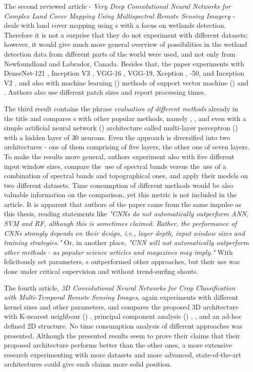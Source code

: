 The second reviewed article - \textit{Very Deep Convolutional Neural Networks for Complex Land Cover Mapping Using Multispectral Remote Sensing Imagery} - deals with land cover mapping using s with a focus on wetlands detection. Therefore it is not a surprise that they do not experiment with different datasets; however, it would give much more general overview of  possibilities in the wetland detection data from different parts of the world were used, and not only from Newfoundland and Labrador, Canada. Besides that, the paper experiments with DenseNet-121 \cite{densenet}, Inception V3 \cite{inception}, VGG-16 \cite{vgg}, VGG-19, Xception \cite{xception}, -50, and Inception  V2 \cite{inception-resnet}, and also with machine learning () methods of support vector machine () \cite{svm} and . Authors also use different patch sizes and report processing times.

The third result contains the phrase \textit{evaluation of different methods} already in the title and compares s with other popular  methods, namely , , and even with a simple artificial neural network () architecture called multi-layer perceptron () \cite{mlp} with a hidden layer of 30 neurons. Even the  approach is diversified into two architectures - one of them comprising of five layers, the other one of seven layers. To make the results more general, authors experiment also with five different input window sizes, compare the~use of spectral bands versus the~use of a combination of spectral bands and topographical ones, and apply their models on two different datasets. Time consumption of different methods would be also valuable information on the comparison, yet this metric is not included in the article. It is apparent that authors of the paper came from the same impulse as this thesis, reading statements like \textit{"CNNs do not automatically outperform ANN, SVM and RF, although this is sometimes claimed. Rather, the performance of CNNs strongly depends on their design, i.e., layer depth, input window sizes and training strategies."} Or, in another place, \textit{"CNN will not automatically outperform other methods - as popular science articles and magazines may imply."} With felicitously set parameters, s outperformed other approaches, but their use was done under critical supervision and without trend-surfing shouts.

The fourth article, \textit{3D Convolutional Neural Networks for Crop Classification with Multi-Temporal Remote Sensing Images}, again experiments with different kernel sizes and other parameters, and compares the proposed 3D  architecture with K-nearest neighbour () \cite{knn}, principal component analysis () \cite{pca}, , and an ad-hoc defined 2D  structure. No time consumption analysis of different approaches was presented. Although the presented results seem to prove their claims that their proposed architecture performs better than the other ones, a more extensive research experimenting with more datasets and more advanced, state-of-the-art architectures could give such claims more solid position.

